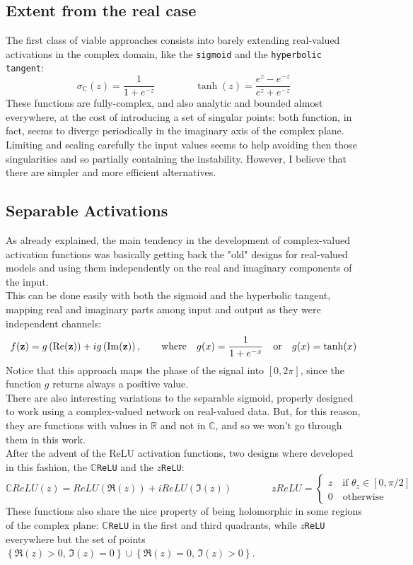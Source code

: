 \documentclass[../main.tex]{subfiles}
\begin{document}
\subsection*{Extent from the real case}
The first class of viable approaches consists into barely extending real-valued activations in the complex domain, like the \texttt{sigmoid} and the \texttt{hyperbolic tangent}:
\[ \sigma_\mathds{C}(z) = \frac{1}{1+e^{-z}}  \qquad\qquad \tanh(z) = \frac{e^z - e^{-z}}{e^z + e^{-z}} \]
These functions are fully-complex, and also analytic and bounded almost everywhere, at the cost of introducing a set of singular points: both function, in fact, seems to diverge periodically in the imaginary axis of the complex plane. Limiting and scaling carefully the input values seems to help avoiding then those singularities and so partially containing the instability. However, I believe that there are simpler and more efficient alternatives.

\subsection*{Separable Activations}
As already explained, the main tendency in the development of complex-valued activation functions was basically getting back the "old" designs for real-valued models and using them independently on the real and imaginary components of the input.\\
This can be done easily with both the sigmoid and the hyperbolic tangent, mapping real and imaginary parts among input and output as they were independent channels:
\[ f(\vb{z}) = g\left(\Re(\vb{z})\right) + ig\left(\Im(\vb{z})\right), \qquad\text{where}\quad g(x) = \frac{1}{1+e^{-x}} \quad\text{or}\quad g(x)=\tanh(x) \]
Notice that this approach maps the phase of the signal into $[0,2\pi]$, since the function $g$ returns always a positive value.\\
There are also interesting variations to the separable sigmoid, properly designed to work using a complex-valued network on real-valued data. But, for this reason, they are functions with values in $\mathds{R}$ and not in $\mathds{C}$, and so we won't go through them in this work.\\
After the advent of the ReLU activation functions, two designs where developed in this fashion, the \texttt{$\mathds{C}$ReLU} and the \texttt{$z$ReLU}:
\[ \mathds{C}ReLU(z) = ReLU(\Re(z)) + iReLU(\Im(z)) \qquad\qquad zReLU = \begin{cases} z\quad \text{if } \theta_z\in[0,\pi/2] \\ 0\quad\text{otherwise} \end{cases} \]
These functions also share the nice property of being holomorphic in some regions of the complex plane: \texttt{$\mathds{C}$ReLU} in the first and third quadrants, while \texttt{$z$ReLU} everywhere but the set of points $\left\{\Re(z)>0,\, \Im(z)=0\right\} \cup \left\{\Re(z)=0,\, \Im(z)>0\right\}$.
\end{document}
